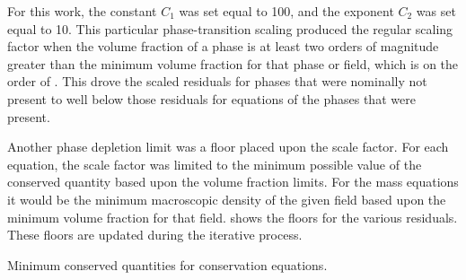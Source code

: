 For this work, the constant $C_1$ was set equal to 100, and the exponent $C_2$ was set equal to 10.
This particular phase-transition scaling produced the regular scaling factor when the volume fraction of a phase is at least two orders of magnitude greater than the minimum volume fraction for that phase or field, which is on the order of .
This drove the scaled residuals for phases that were nominally not present to well below those residuals for equations of the phases that were present.

Another phase depletion limit was a floor placed upon the scale factor.
For each equation, the scale factor was limited to the minimum possible value of the conserved quantity based upon the volume fraction limits.
For the mass equations it would be the minimum macroscopic density of the given field based upon the minimum volume fraction for that field.
 shows the floors for the various residuals.
These floors are updated during the iterative process.

\begin{table}[ht]
\centering
\singlespace

\caption{Minimum conserved quantities for conservation equations.}
\label{tab:minimumConservedValues}
\end{table}



